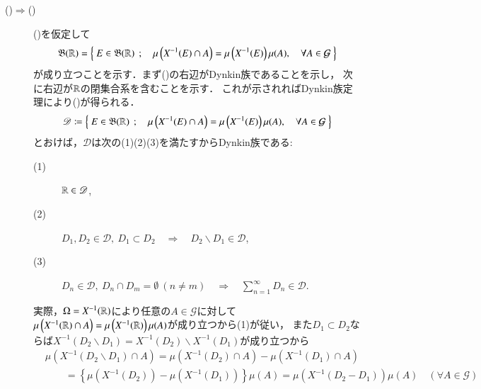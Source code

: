 	\begin{prf}\mbox{}
		\begin{description}
			\item[()$\Rightarrow$()] 
				()を仮定して
				\begin{align}
					\mathfrak{B}(\mathbb{R}) = \left\{\ E \in \mathfrak{B}(\mathbb{R})\ \, ; \quad \mu\left( X^{-1}(E) \cap A \right) = \mu\left( X^{-1}(E) \right) \mu(A),\quad \forall A \in \mathcal{G}\ \right\}
					\label{eq:prp_equivalent_condition_of_independence_3}
				\end{align}
				が成り立つことを示す．まず()の右辺がDynkin族であることを示し，
				次に右辺が$\mathbb{R}$の閉集合系を含むことを示す．
				これが示されればDynkin族定理により()が得られる．
				\begin{align}
					\mathscr{D} \coloneqq \left\{\ E \in \mathfrak{B}(\mathbb{R})\ \, ; \quad \mu\left( X^{-1}(E) \cap A \right) = \mu\left( X^{-1}(E) \right) \mu(A),\quad \forall A \in \mathcal{G}\ \right\}
				\end{align}
				とおけば，$\mathscr{D}$は次の(1)(2)(3)を満たすからDynkin族である:
				\begin{description}
					\item[(1)] $\mathbb{R} \in \mathscr{D}$,
					\item[(2)] $D_1,D_2 \in \mathscr{D},\ D_1 \subset D_2\quad \Rightarrow\quad D_2 \backslash D_1 \in \mathscr{D}$,
					\item[(3)] $D_n \in \mathscr{D},\ D_n \cap D_m = \emptyset\ (n \neq m)\quad \Rightarrow\quad \sum_{n=1}^{\infty} D_n \in \mathscr{D}$.
				\end{description}
				実際，$\Omega = X^{-1}(\mathbb{R})$により任意の$A \in \mathcal{G}$に対して
				$\mu\left( X^{-1}(\mathbb{R}) \cap A \right) = \mu\left( X^{-1}(\mathbb{R}) \right) \mu(A)$が成り立つから(1)が従い，
				また$D_1 \subset D_2$ならば$X^{-1}(D_2 \backslash D_1) = X^{-1}(D_2) \backslash X^{-1}(D_1)$が成り立つから
				\begin{align}
					&\mu\left( X^{-1}(D_2 \backslash D_1) \cap A \right) = \mu \left( X^{-1}(D_2) \cap A \right) - \mu\left( X^{-1}(D_1) \cap A \right) \\
					&\qquad = \left\{ \mu\left( X^{-1}(D_2) \right) - \mu \left( X^{-1}(D_1) \right) \right\}\mu(A)
					= \mu\left( X^{-1}(D_2 - D_1) \right) \mu(A)\quad (\forall A \in \mathcal{G})
				\end{align}

\end{description}
\end{prf}
